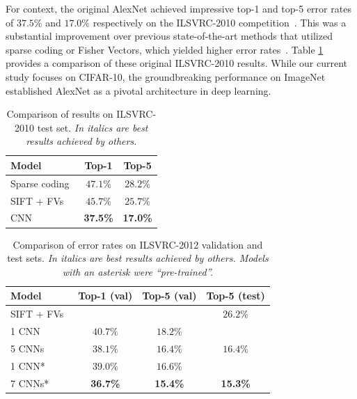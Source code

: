 \documentclass{article}
\begin{document}
For context, the original AlexNet achieved impressive top-1 and top-5 error rates of $37.5\%$ and $17.0\%$ respectively on the ILSVRC-2010 competition~\cite{krizhevsky2012imagenet}. This was a substantial improvement over previous state-of-the-art methods that utilized sparse coding or Fisher Vectors, which yielded higher error rates~\cite{berg2010large, sanchez2011high}.
Table \ref{tab:ilsvrc2010} provides a comparison of these original ILSVRC-2010 results. While our current study focuses on CIFAR-10, the groundbreaking performance on ImageNet established AlexNet as a pivotal architecture in deep learning.

\begin{table}[h!]
\centering
\caption{Comparison of results on ILSVRC-2010 test set. \textit{In italics are best results achieved by others.}}
\label{tab:ilsvrc2010}
\begin{tabular}{lcc}
\toprule
\textbf{Model} & \textbf{Top-1} & \textbf{Top-5} \\
\midrule
Sparse coding~\cite{berg2010large} & $47.1\%$ & $28.2\%$ \\
SIFT + FVs~\cite{sanchez2011high} & $45.7\%$ & $25.7\%$ \\
CNN~\cite{krizhevsky2012imagenet} & \textbf{37.5\%} & \textbf{17.0\%} \\
\bottomrule
\end{tabular}
\end{table}

\begin{table}[h!]
\centering
\caption{Comparison of error rates on ILSVRC-2012 validation and test sets. \textit{In italics are best results achieved by others. Models with an asterisk were ``pre-trained''.}}
\label{tab:ilsvrc2012}
\begin{tabular}{lccc}
\toprule
\textbf{Model} & \textbf{Top-1 (val)} & \textbf{Top-5 (val)} & \textbf{Top-5 (test)} \\
\midrule
SIFT + FVs~\cite{deng2012ilsvrc} & & & $26.2\%$ \\
1 CNN~\cite{krizhevsky2012imagenet} & $40.7\%$ & $18.2\%$ & \\
5 CNNs~\cite{krizhevsky2012imagenet} & $38.1\%$ & $16.4\%$ & $16.4\%$ \\
1 CNN*~\cite{krizhevsky2012imagenet} & $39.0\%$ & $16.6\%$ & \\
7 CNNs*~\cite{krizhevsky2012imagenet} & \textbf{36.7\%} & \textbf{15.4\%} & \textbf{15.3\%} \\
\bottomrule
\end{tabular}
\end{table}
\end{document}
